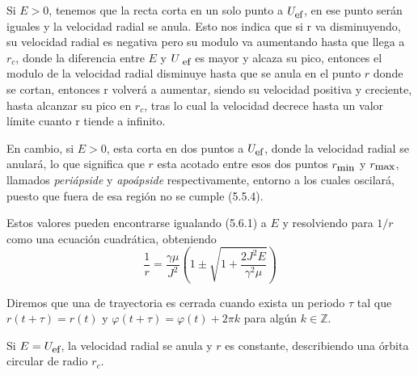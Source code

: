 Si $E>0$, tenemos que la recta corta en un solo punto a $U_{\mbox{\small ef}}$, en ese punto serán iguales y la velocidad radial se anula. Esto nos indica que si r va disminuyendo, su velocidad radial es negativa pero su modulo va aumentando hasta que llega a $r_c$, donde la diferencia entre $E$ y $U_{\mbox{ \small ef}}$ es mayor y alcaza su pico, entonces el modulo de la velocidad radial disminuye hasta que se anula en el punto $r$ donde se cortan, entonces r volverá a aumentar, siendo su velocidad positiva y creciente, hasta alcanzar su pico en $r_c$, tras lo cual la velocidad decrece hasta un valor límite cuanto r tiende a infinito.

En cambio, si $E>0$, esta corta en dos puntos a $U_{ \mbox{\small ef}}$, donde la velocidad radial se anulará, lo que significa que $r$ esta acotado entre esos dos puntos $r_{\mbox{\small min}}$ y $r_{\mbox{\small max}}$, llamados \textit{periápside} y \textit{apoápside} respectivamente, entorno a los cuales oscilará, puesto que fuera de esa región no se cumple (5.5.4).

Estos valores pueden encontrarse igualando (5.6.1) a $E$ y resolviendo para $1/r$ como una ecuación cuadrática, obteniendo
\begin{equation} \label{5.6.2}
    \frac{1}{r}=\frac{\gamma \mu}{J^2}\left(1\pm\sqrt{1+\frac{2J^2 E}{\gamma^2 \mu}}\right)
\end{equation} 

Diremos que una de trayectoria es cerrada cuando exista un periodo $\tau$ tal que $r(t+\tau)=r(t)$ y $\varphi(t+\tau)=\varphi(t) +2 \pi k$ para algún $k \in \mathbb{Z}$.

Si $E=U_{\mbox{\small ef}}$, la velocidad radial se anula y $r$ es constante, describiendo una órbita circular de radio $r_c$.

